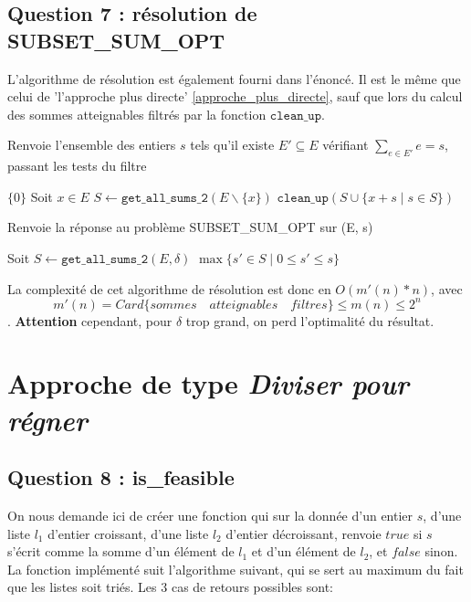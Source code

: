 \documentclass[10pt]{article}
\let\oldReturn\Return
\renewcommand{\Return}{\State\oldReturn}
\begin{document}
			\subsection{Question 7 : résolution de SUBSET\_SUM\_OPT}
				L'algorithme de résolution est également fourni dans l'énoncé.
				Il est le même que celui de 'l'approche plus directe' \ref{approche_plus_directe}, sauf que
				lors du calcul des sommes atteignables filtrés par la fonction $\mathtt{clean\_up}$.
				
				\begin{algorithm}
					\caption{Renvoie l'ensemble des entiers $s$ tels qu'il existe
							$E' \subseteq E$ vérifiant $\sum\limits_{e \in E'}e = s$, passant les tests du filtre}
					\begin{algorithmic}[1]
								\Return $\{0\}$
							\EndIf
							\State Soit $x \in E$
							\State $S \leftarrow \mathtt{get\_all\_sums\_2}(E \backslash \{x\})$
							\Return $\mathtt{clean\_up}(S \cup \{x + s \mid s \in S\})$
						\EndFunction
					\end{algorithmic}
				\end{algorithm}
			
			\begin{algorithm}
				\caption{Renvoie la réponse au problème SUBSET\_SUM\_OPT sur (E, s)}
				\begin{algorithmic}[1]
					\Function{subset\_sum}{$E \subset \mathbb{N}, s \in \mathbb{N}$}
						\State Soit $S \leftarrow \mathtt{get\_all\_sums\_2}(E, \delta)$
						\Return $\max\{s' \in S \mid 0 \leq s' \leq s\}$
					\EndFunction
				\end{algorithmic}
			\end{algorithm}
			La complexité de cet algorithme de résolution est donc en $\boxed{O(m'(n) * n)}$,
			avec $$m'(n) = Card\{sommes \quad atteignables \quad filtres\} \leq m(n) \leq 2^n$$.
			\textbf{Attention} cependant, pour $\delta$ trop grand, on perd l'optimalité du résultat.

		\newpage
		\section{Approche de type \textit{Diviser pour régner}}\label{approche_naive}
			\subsection{Question 8 : is\_feasible}\label{is_feasible}
				On nous demande ici de créer une fonction qui sur la donnée d'un entier $s$, d'une liste $l_1$ d'entier croissant,
				d'une liste $l_2$ d'entier décroissant, renvoie $true$ si $s$ s'écrit comme la somme d'un élément de $l_1$ et d'un
				élément de $l_2$, et $false$ sinon.
				\newline
				La fonction implémenté suit l'algorithme suivant, qui se sert au maximum du fait que les listes soit triés.
				Les 3 cas de retours possibles sont:
				
\end{document}
